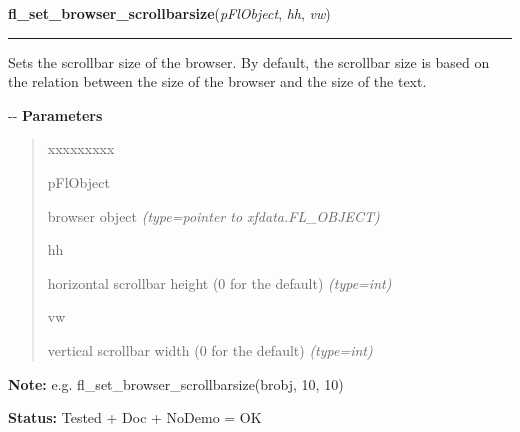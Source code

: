 \hspace{.8\funcindent}\begin{boxedminipage}{\funcwidth}

    \raggedright \textbf{fl\_set\_browser\_scrollbarsize}(\textit{pFlObject}, \textit{hh}, \textit{vw})

    \vspace{-1.5ex}

    \rule{\textwidth}{0.5\fboxrule}
\setlength{\parskip}{2ex}

Sets the scrollbar size of the browser. By default, the scrollbar size
is based on the relation between the size of the browser and the size of
the text.

-{}-
\setlength{\parskip}{1ex}
      \textbf{Parameters}
      \vspace{-1ex}

      \begin{quote}
        \begin{Ventry}{xxxxxxxxx}

          \item[pFlObject]


browser object
            {\it (type=pointer to xfdata.FL\_OBJECT)}

          \item[hh]


horizontal scrollbar height (0 for the default)
            {\it (type=int)}

          \item[vw]


vertical scrollbar width (0 for the default)
            {\it (type=int)}

        \end{Ventry}

      \end{quote}

\textbf{Note:} 
e.g. fl\_set\_browser\_scrollbarsize(brobj, 10, 10)


\textbf{Status:} 
Tested + Doc + NoDemo = OK


    \end{boxedminipage}

    \label{xformslib:flbrowser:fl_show_browser_line}

    \vspace{0.5ex}

